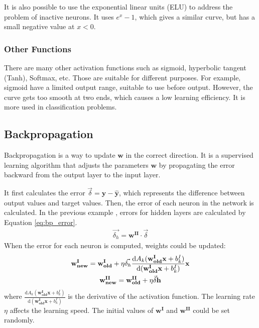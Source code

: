 It is also possible to use the exponential linear units (ELU) to address the problem of inactive neurons. 
It uses $e^x-1$, which gives a similar curve, but has a small negative value at $x < 0$. 

\subsubsection{Other Functions}

There are many other activation functions such as sigmoid, hyperbolic tangent (Tanh), Softmax, etc.
Those are suitable for different purposes. For example, sigmoid have a limited output range, suitable to use before output. 
However, the curve gets too smooth at two ends, which causes a low learning efficiency. It is more used in classification problems. 

\subsection{Backpropagation}

Backpropagation\cite{Sieci} is a way to update $\mathbf{w}$ in the correct direction. It is a supervised learning algorithm that adjusts the parameters $\mathbf{w}$
by propagating the error backward from the output layer to the input layer. 

It first calculates the error $\vec{\delta} = \mathbf{y} - \hat{\mathbf{y}} $, which represents the difference between output values and target values. 
Then, the error of each neuron in the network is calculated. In the previous example , errors for hidden layers are calculated by Equation \ref{eq:bp_error}.  
\begin{gather}
    \vec{\delta_h} = \mathbf{w^{II}} \cdot \vec{\delta}
    \label{eq:bp_error}
\end{gather}
When the error for each neuron is computed, weights could be updated:
\begin{gather}
    \mathbf{w^{I}_{new}} = \mathbf{w^{I}_{old}} + \eta \vec{\delta_h} \frac{\mathrm{d} A_k(\mathbf{w^I_{old}x} + b^I_k)}{\mathrm{d} (\mathbf{w^I_{old}x} + b^I_k)} \mathbf{x} \notag\\
    \mathbf{w^{II}_{new}} = \mathbf{w^{II}_{old}} + \eta \vec{\delta} \mathbf{h} 
\end{gather}
where $\frac{\mathrm{d} A_k(\mathbf{w^I_{old}x} + b^I_k)}{\mathrm{d} (\mathbf{w^I_{old}x} + b^I_k)}$ is the derivative of the activation function.
The learning rate $\eta$ affects the learning speed. The initial values of $\mathbf{w^{I}}$ and $\mathbf{w^{II}}$ could be set randomly. 

